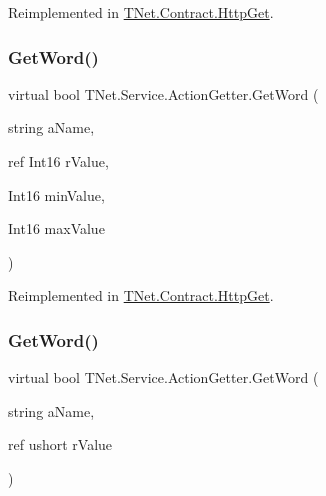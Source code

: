 Reimplemented in \mbox{\hyperlink{class_t_net_1_1_contract_1_1_http_get_a6f010b795d8a3915c1a22671ea0d9cf4}{T\+Net.\+Contract.\+Http\+Get}}.

\mbox{\label{class_t_net_1_1_service_1_1_action_getter_a180654258e018584f5148e4e5f945105}} 
\subsubsection{\texorpdfstring{Get\+Word()}{GetWord()}\hspace{0.1cm}{\footnotesize\ttfamily [3/5]}}
{\footnotesize\ttfamily virtual bool T\+Net.\+Service.\+Action\+Getter.\+Get\+Word (\begin{DoxyParamCaption}\item[{string}]{a\+Name,  }\item[{ref Int16}]{r\+Value,  }\item[{Int16}]{min\+Value,  }\item[{Int16}]{max\+Value }\end{DoxyParamCaption})\hspace{0.3cm}{\ttfamily [virtual]}}







Reimplemented in \mbox{\hyperlink{class_t_net_1_1_contract_1_1_http_get_a5988342332c15e7ec67529c5cf63311a}{T\+Net.\+Contract.\+Http\+Get}}.

\mbox{\label{class_t_net_1_1_service_1_1_action_getter_a9709d8667c0ba20a6f1dd3e2141ea61d}} 
\subsubsection{\texorpdfstring{Get\+Word()}{GetWord()}\hspace{0.1cm}{\footnotesize\ttfamily [4/5]}}
{\footnotesize\ttfamily virtual bool T\+Net.\+Service.\+Action\+Getter.\+Get\+Word (\begin{DoxyParamCaption}\item[{string}]{a\+Name,  }\item[{ref ushort}]{r\+Value }\end{DoxyParamCaption})\hspace{0.3cm}{\ttfamily [virtual]}}







